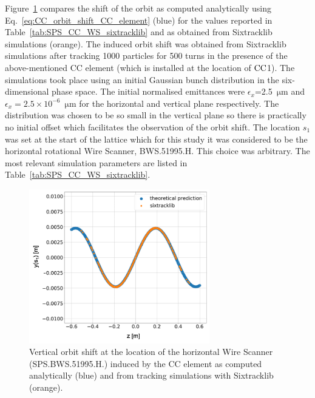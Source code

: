 Figure~\ref{fig:sixtracklib_CC_orbit_shift_vs_theory} compares the shift of the orbit as computed analytically using Eq.~\eqref{eq:CC_orbit_shift_CC_element} (blue) for the values reported in Table~\ref{tab:SPS_CC_WS_sixtracklib} and as obtained from Sixtracklib simulations (orange). The induced orbit shift was obtained from Sixtracklib simulations after tracking 1000 particles for 500 turns in the presence of the above-mentioned CC element (which is installed at the location of ${\mathrm{CC}}$1). The simulations took place using an initial Gaussian bunch distribution in the six-dimensional phase space. The initial normalised emittances were $\epsilon_x$=2.5\, $\mathrm{\mu m}$ and $\epsilon_x=2.5 \times 10^{-6}$\, $\mathrm{\mu m}$ for the horizontal and vertical plane respectively. The distribution was chosen to be so small in the vertical plane so there is practically no initial offset which facilitates the observation of the orbit shift. %
 The location $s_1$ was set at the start of the lattice which for this study it was considered to be the horizontal rotational Wire Scanner, BWS.51995.H. This choice was arbitrary. The most relevant simulation parameters are listed in Table~\ref{tab:SPS_CC_WS_sixtracklib}.


\begin{figure}[!h]
    \centering         
    \includegraphics[width=0.7\textwidth]{images/Ch6/Vcc_orbit_shfit_sixtracklib_sanity_check.png}
        \caption{Vertical orbit shift at the location of the horizontal Wire Scanner (SPS.BWS.51995.H.) induced by the CC element as computed analytically (blue) and from tracking simulations with Sixtracklib (orange).}
        \label{fig:sixtracklib_CC_orbit_shift_vs_theory}
\end{figure}

